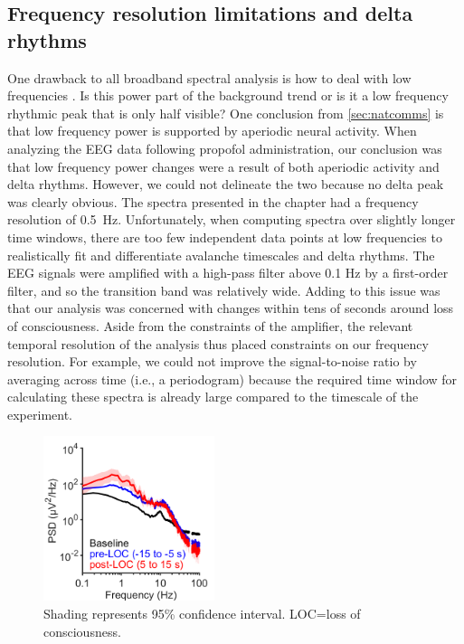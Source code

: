 \subsection{Frequency resolution limitations and delta rhythms}
One drawback to all broadband spectral analysis is how to deal with low frequencies \cite{Demanuele2007,Gerster2022}. Is this power part of the background trend or is it a low frequency rhythmic peak that is only half visible? One conclusion from \autoref{sec:natcomms} is that low frequency power is supported by aperiodic neural activity. When analyzing the EEG data following propofol administration, our conclusion was that low frequency power changes were a result of both aperiodic activity and delta rhythms. However, we could not delineate the two because no delta peak was clearly obvious. The spectra presented in the chapter had a frequency resolution of \qty{0.5}{\hertz}. Unfortunately, when computing spectra over slightly longer time windows, there are too few independent data points at low frequencies to realistically fit and differentiate avalanche timescales and delta rhythms. The EEG signals were amplified with a high-pass filter above 0.1 Hz by a first-order filter, and so the transition band was relatively wide. Adding to this issue was that our analysis was concerned with changes within tens of seconds around loss of consciousness. Aside from the constraints of the amplifier, the relevant temporal resolution of the analysis thus placed constraints on our frequency resolution. For example, we could not improve the signal-to-noise ratio by averaging across time (i.e., a periodogram) because the required time window for calculating these spectra is already large compared to the timescale of the experiment.

\begin{figure}
\vspace{-13pt}
\centering
\includegraphics[width=50mm]{Figures/Discussion/delta_rhythms.png}
\vspace{-5pt}
\caption{ Shading represents 95\% confidence interval. LOC=loss of consciousness.} \label{fig:delta_resolution}
\end{figure}


